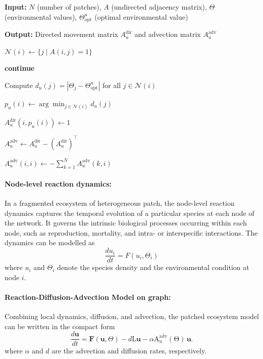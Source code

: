 \documentclass[12pt]{article}
\begin{document}
\begin{algorithm}
\caption{Construction of the directed flow and advection matrix}
\begin{algorithmic}

\State \textbf{Input:} $N$ (number of patches), 
$A$ (undirected adjacency matrix), 
$\Theta$ (environmental values), 
$\Theta_{\mathrm{opt}}^{u}$ (optimal environmental value)

\State \textbf{Output:} Directed movement matrix $A_u^{\mathrm{dir}}$ and advection matrix $A_u^{\mathrm{adv}}$

    \State $\mathcal{N}(i) \gets \{ j \mid A(i,j)=1 \}$ 
    
        \State \textbf{continue}
    \EndIf

    \State Compute $d_u(j) = |\Theta_j - \Theta_{\mathrm{opt}}^{u}|$ for all $j \in \mathcal{N}(i)$
    
    \State $p_u(i) \gets \arg\min_{j \in \mathcal{N}(i)} d_u(j)$
    
    \State $A_u^{\mathrm{dir}}(i, p_u(i)) \gets 1$
\EndFor

\State $A_u^{\mathrm{adv}} \gets A_u^{\mathrm{dir}} - (A_u^{\mathrm{dir}})^{\top}$

    \State $A_u^{\mathrm{adv}}(i,i) \gets -\sum_{k=1}^{N} A_u^{\mathrm{adv}}(k,i)$
\EndFor

\end{algorithmic}
\end{algorithm}


\paragraph{Node-level reaction dynamics:} In a fragmented ecosystem of heterogeneous patch, the node-level reaction dynamics captures the temporal evolution of a particular species at each node of the network. It governs the intrinsic biological processes occurring within each node, such as reproduction, mortality, and intra- or interspecific interactions. The dynamics can be modelled as 
\begin{equation*}
    \dfrac{du_i}{dt} = F(u_i,\Theta_i)
\end{equation*}
where $u_i$ and $\Theta_i$ denote the species density and the environmental condition at node $i.$

\paragraph{Reaction-Diffusion-Advection Model on graph:}
Combining local dynamics, diffusion, and advection, the 
patched ecosystem model can be written in the compact form
\begin{equation}\label{eq:Compact_model}
    \frac{d \mathbf{u}}{dt}
=
\mathbf{F}(\mathbf{u}, \Theta)
- d \mathrm{L}\mathbf{u}
- \alpha \mathrm{A_u^{adv}(\Theta)}\,\mathbf{u}.
\end{equation}
where $\alpha$ and $d$ are the advection and diffusion rates, respectively. 
\end{document}
